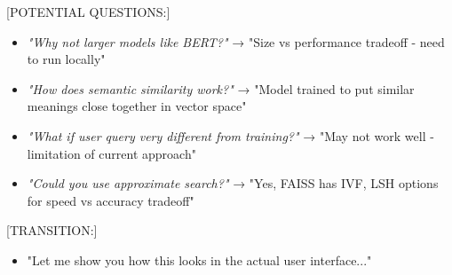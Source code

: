 {\begin{columns}[T]
\begin{column}{0.49\textwidth}
			\vspace{0.1cm}
			[POTENTIAL QUESTIONS:]
			\begin{itemize}
			  \item \textit{"Why not larger models like BERT?"} → "Size vs performance tradeoff - need to run locally"
			  \item \textit{"How does semantic similarity work?"} → "Model trained to put similar meanings close together in vector space"
			  \item \textit{"What if user query very different from training?"} → "May not work well - limitation of current approach"
			  \item \textit{"Could you use approximate search?"} → "Yes, FAISS has IVF, LSH options for speed vs accuracy tradeoff"
			\end{itemize}
			
			\vspace{0.1cm}
			[TRANSITION:]
			\begin{itemize}
			  \item "Let me show you how this looks in the actual user interface..."
			\end{itemize}
    \end{column}
  \end{columns}
}
